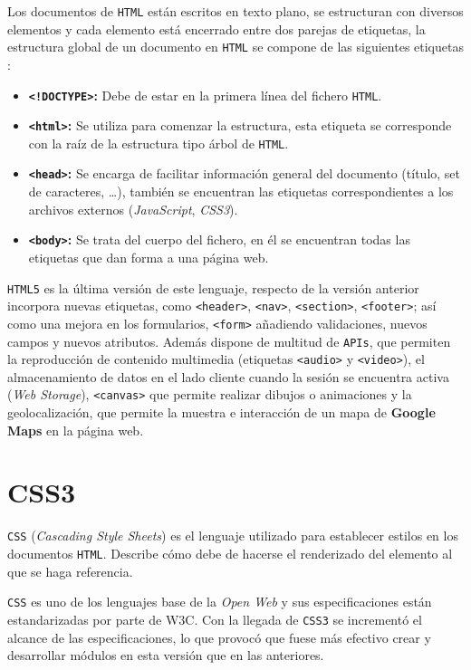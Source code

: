 \documentclass[a4paper, 12pt]{book}
\begin{document}
Los documentos de \texttt{HTML} están escritos en texto plano, se estructuran con diversos elementos y cada elemento está encerrado entre dos parejas de etiquetas\cite{mdnhtml}, la estructura global de un documento en \texttt{HTML} se compone de las siguientes etiquetas \cite{gauchat2012gran}:

\begin{itemize}
	\item \textbf{\texttt{<!DOCTYPE>}:} Debe de estar en la primera línea del fichero \texttt{HTML}.
	\item \textbf{\texttt{<html>}:} Se utiliza para comenzar la estructura, esta etiqueta se corresponde con la raíz de la estructura tipo árbol de \texttt{HTML}.
	\item \textbf{\texttt{<head>}:} Se encarga de facilitar información general del documento (título, set de caracteres, \ldots), también se encuentran las etiquetas correspondientes a los archivos externos (\textit{JavaScript}, \textit{CSS3}).
	\item \textbf{\texttt{<body>}:} Se trata del cuerpo del fichero, en él se encuentran todas las etiquetas que dan forma a una página web.
\end{itemize}

\texttt{HTML5} es la última versión de este lenguaje, respecto de la versión anterior incorpora nuevas etiquetas, como \texttt{<header>}, \texttt{<nav>}, \texttt{<section>}, \texttt{<footer>}; así como una mejora en los formularios, \texttt{<form>} añadiendo validaciones, nuevos campos y nuevos atributos. Además dispone de multitud de \texttt{APIs}, que permiten la reproducción de contenido multimedia (etiquetas \texttt{<audio>} y \texttt{<video>}), el almacenamiento de datos en el lado cliente cuando la sesión se encuentra activa (\textit{Web Storage}), \texttt{<canvas>} que permite realizar dibujos o animaciones y la geolocalización, que permite la muestra e interacción de un mapa de \textbf{Google Maps} en la página web.

\section{CSS3}
\label{sec:css3}

\texttt{CSS} (\textit{Cascading Style Sheets})\cite{mdncss} es el lenguaje utilizado para establecer estilos en los documentos \texttt{HTML}. Describe cómo debe de hacerse el renderizado del elemento al que se haga referencia\cite{mdncss}.

\texttt{CSS} es uno de los lenguajes base de la \textit{Open Web} y sus especificaciones están estandarizadas por parte de W3C. Con la llegada de \texttt{CSS3} se incrementó el alcance de las especificaciones, lo que provocó que fuese más efectivo crear y desarrollar módulos en esta versión que en las anteriores.
\end{document}
